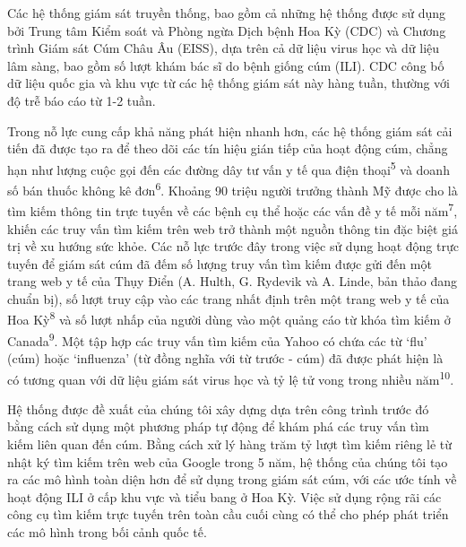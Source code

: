 \documentclass[12pt, a4paper]{book}
\begin{document}
Các hệ thống giám sát truyền thống, bao gồm cả những hệ thống được sử dụng bởi Trung tâm Kiểm soát và Phòng ngừa Dịch bệnh Hoa Kỳ (CDC) và Chương trình Giám sát Cúm Châu Âu (EISS), dựa trên cả dữ liệu virus học và dữ liệu lâm sàng, bao gồm số lượt khám bác sĩ do bệnh giống cúm (ILI). CDC công bố dữ liệu quốc gia và khu vực từ các hệ thống giám sát này hàng tuần, thường với độ trễ báo cáo từ 1-2 tuần.

Trong nỗ lực cung cấp khả năng phát hiện nhanh hơn, các hệ thống giám sát cải tiến đã được tạo ra để theo dõi các tín hiệu gián tiếp của hoạt động cúm, chẳng hạn như lượng cuộc gọi đến các đường dây tư vấn y tế qua điện thoại\textsuperscript{5} và doanh số bán thuốc không kê đơn\textsuperscript{6}. Khoảng 90 triệu người trưởng thành Mỹ được cho là tìm kiếm thông tin trực tuyến về các bệnh cụ thể hoặc các vấn đề y tế mỗi năm\textsuperscript{7}, khiến các truy vấn tìm kiếm trên web trở thành một nguồn thông tin đặc biệt giá trị về xu hướng sức khỏe. Các nỗ lực trước đây trong việc sử dụng hoạt động trực tuyến để giám sát cúm đã đếm số lượng truy vấn tìm kiếm được gửi đến một trang web y tế của Thụy Điển (A. Hulth, G. Rydevik và A. Linde, bản thảo đang chuẩn bị), số lượt truy cập vào các trang nhất định trên một trang web y tế của Hoa Kỳ\textsuperscript{8} và số lượt nhấp của người dùng vào một quảng cáo từ khóa tìm kiếm ở Canada\textsuperscript{9}. Một tập hợp các truy vấn tìm kiếm của Yahoo có chứa các từ `flu' (cúm) hoặc `influenza' (từ đồng nghĩa với từ trước - cúm) đã được phát hiện là có tương quan với dữ liệu giám sát virus học và tỷ lệ tử vong trong nhiều năm\textsuperscript{10}.

Hệ thống được đề xuất của chúng tôi xây dựng dựa trên công trình trước đó bằng cách sử dụng một phương pháp tự động để khám phá các truy vấn tìm kiếm liên quan đến cúm. Bằng cách xử lý hàng trăm tỷ lượt tìm kiếm riêng lẻ từ nhật ký tìm kiếm trên web của Google trong 5 năm, hệ thống của chúng tôi tạo ra các mô hình toàn diện hơn để sử dụng trong giám sát cúm, với các ước tính về hoạt động ILI ở cấp khu vực và tiểu bang ở Hoa Kỳ. Việc sử dụng rộng rãi các công cụ tìm kiếm trực tuyến trên toàn cầu cuối cùng có thể cho phép phát triển các mô hình trong bối cảnh quốc tế.

% 
\end{document}
